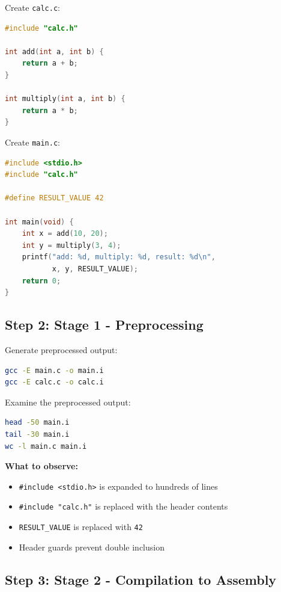 Create \texttt{calc.c}:

\begin{lstlisting}[language=C]
#include "calc.h"

int add(int a, int b) {
    return a + b;
}

int multiply(int a, int b) {
    return a * b;
}
\end{lstlisting}

Create \texttt{main.c}:

\begin{lstlisting}[language=C]
#include <stdio.h>
#include "calc.h"

#define RESULT_VALUE 42

int main(void) {
    int x = add(10, 20);
    int y = multiply(3, 4);
    printf("add: %d, multiply: %d, result: %d\n", 
           x, y, RESULT_VALUE);
    return 0;
}
\end{lstlisting}

\subsection{Step 2: Stage 1 - Preprocessing}

Generate preprocessed output:

\begin{lstlisting}[language=bash]
gcc -E main.c -o main.i
gcc -E calc.c -o calc.i
\end{lstlisting}

Examine the preprocessed output:

\begin{lstlisting}[language=bash]
head -50 main.i
tail -30 main.i
wc -l main.c main.i
\end{lstlisting}

\textbf{What to observe:}
\begin{itemize}
\item \texttt{\#include <stdio.h>} is expanded to hundreds of lines
\item \texttt{\#include "calc.h"} is replaced with the header contents
\item \texttt{RESULT\_VALUE} is replaced with \texttt{42}
\item Header guards prevent double inclusion
\end{itemize}

\subsection{Step 3: Stage 2 - Compilation to Assembly}

